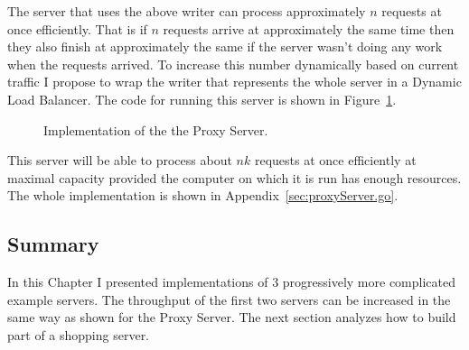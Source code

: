 \newpage
The server that uses the above writer can process approximately $n$ requests
at once efficiently. That is if $n$ requests arrive at approximately the same
time then they also finish at approximately the same if the server wasn't
doing any work when the requests arrived.
To increase this number dynamically based on current traffic I propose
to wrap the writer that represents the whole server in a Dynamic Load
Balancer. The code for running this server is shown in 
Figure~\ref{fig:ProxyServerImpl}.
\begin{figure}[h]
 
\caption[scale=1.0]{Implementation of the the Proxy Server.}
\label{fig:ProxyServerImpl}
\end{figure}

This server will be able to process about $n k$ requests at once efficiently
at maximal capacity provided the computer on which it is run has enough resources.
The whole implementation is shown in Appendix~\ref{sec:proxyServer.go}.

\subsection{Summary}
In this Chapter I presented implementations of 3 progressively more 
complicated example servers. The throughput of the first two servers
can be increased in the same way as shown for the Proxy Server. The 
next section analyzes how to build part of a shopping server.
